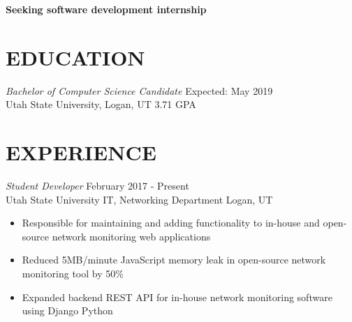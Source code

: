 \documentclass[10pt, resumewidth=7in]{res} %
\begin{document}
\centerline{\bf Seeking software development internship}
\vspace{-1.0em}
\begin{resume}

%
%


\section{EDUCATION}

{\sl Bachelor of Computer Science Candidate}  \hfill Expected: May 2019 \\
Utah State University, Logan, UT \hfill 3.71 GPA



\section{EXPERIENCE}

{\sl Student Developer} \hfill February 2017 - Present \\
Utah State University IT, Networking Department \hfill Logan, UT
\begin{itemize} \itemsep -2pt %
\item Responsible for maintaining and adding functionality to in-house and open-source network monitoring web applications
\item Reduced 5MB/minute JavaScript memory leak in open-source network monitoring tool by 50\%
\item Expanded backend REST API for in-house network monitoring software using Django Python
\end{itemize}


\end{resume}
\end{document}
